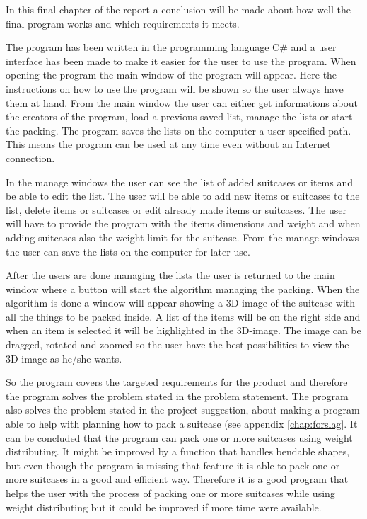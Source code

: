 In this final chapter of the report a conclusion will be made about how well the final program works and which requirements it meets.

The program has been written in the programming language C\# and a user interface has been made to make it easier for the user to use the program. When opening the program the main window of the program will appear. Here the instructions on how to use the program will be shown so the user always have them at hand. From the main window the user can either get informations about the creators of the program, load a previous saved list, manage the lists or start the packing. The program saves the lists on the computer a user specified path. This means the program can be used at any time even without an Internet connection. 

In the manage windows the user can see the list of added suitcases or items and be able to edit the list. The user will be able to add new items or suitcases to the list, delete items or suitcases or edit already made items or suitcases. The user will have to provide the program with the items dimensions and weight and when adding suitcases also the weight limit for the suitcase. From the manage windows the user can save the lists on the computer for later use. 

After the users are done managing the lists the user is returned to the main window where a button will start the algorithm managing the packing. When the algorithm is done a window will appear showing a 3D-image of the suitcase with all the things to be packed inside. A list of the items will be on the right side and when an item is selected it will be highlighted in the 3D-image. The image can be dragged, rotated and zoomed so the user have the best possibilities to view the 3D-image as he/she wants.

So the program covers the targeted requirements for the product and therefore the program solves the problem stated in the problem statement. The program also solves the problem stated in the project suggestion, about making a program able to help with planning how to pack a suitcase (see appendix \ref{chap:forslag}. It can be concluded that the program can pack one or more suitcases using weight distributing. It might be improved by a function that handles bendable shapes, but even though the program is missing that feature it is able to pack one or more suitcases in a good and efficient way. Therefore it is a good program that helps the user with the process of packing one or more suitcases while using weight distributing but it could be improved if more time were available. 